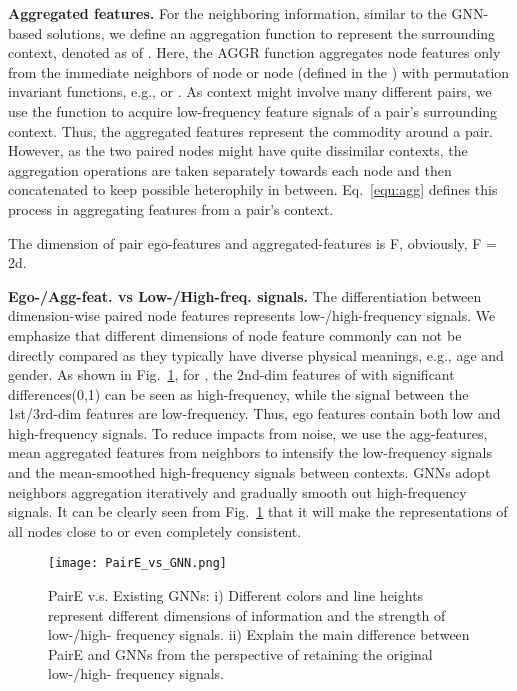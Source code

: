 \documentclass[10pt,journal,compsoc]{IEEEtran}
\begin{document}
\noindent\textbf{Aggregated features.}
For the neighboring information, similar to the GNN-based solutions, we define an aggregation function to represent the surrounding context, denoted as  of . Here, the AGGR function aggregates node features only from the immediate neighbors of node  or node  (defined in the  ) with permutation invariant functions, e.g.,  or . As context might involve many different pairs, we use the  function to acquire low-frequency feature signals of a pair's surrounding context. Thus, the aggregated features represent the commodity around a pair. However, as the two paired nodes might have quite dissimilar contexts, the aggregation operations are taken separately towards each node and then concatenated to keep possible heterophily in between. Eq.~\ref{equ:agg} defines this process in aggregating features from a pair's context.



The dimension of pair ego-features and aggregated-features is F, obviously, F = 2d.


\noindent\textbf{Ego-/Agg-feat. vs Low-/High-freq. signals.} The differentiation between dimension-wise paired node features represents low-/high-frequency signals. We emphasize that different dimensions of node feature commonly can not be directly compared as they typically have diverse physical meanings, e.g., age and gender. As shown in  Fig.~\ref{fig:compare}, for , the 2nd-dim features of  with significant differences(0,1) can be seen as high-frequency, while the signal between the 1st/3rd-dim features are low-frequency. Thus, ego features contain both low and high-frequency signals. To reduce impacts from noise, we use the agg-features, mean aggregated features from  neighbors to intensify the low-frequency signals and the mean-smoothed high-frequency signals between  contexts. GNNs adopt neighbors aggregation iteratively and gradually smooth out high-frequency signals. It can be clearly seen from Fig.~\ref{fig:compare} that it will make the representations of all nodes close to or even completely consistent.

\begin{figure}[h]
\centering
 \texttt{[image: PairE\_vs\_GNN.png]}
\centering
\caption{PairE v.s. Existing GNNs: i) Different colors and line heights represent different dimensions of information and the strength of low-/high- frequency signals. ii) Explain the main difference between PairE and GNNs from the perspective of retaining the original low-/high- frequency signals.}
\vspace{-0.2cm}
\label{fig:compare}
\end{figure}
\end{document}
